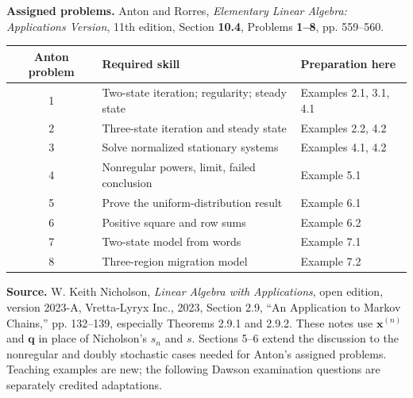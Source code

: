 \documentclass{article}
\theoremstyle{plain}
\theoremstyle{definition}
\theoremstyle{remark}
\renewcommand{\vec}[1]{\mathbf{#1}}
\newcommand{\work}{\par\vfill}
\begin{document}
\medskip\textbf{Assigned problems.} Anton and Rorres, \emph{Elementary Linear Algebra: Applications Version}, 11th edition, Section \textbf{10.4}, Problems \textbf{1--8}, pp. 559--560.
\begin{center}
\renewcommand{\arraystretch}{1.4}
\begin{tabular}{c|l|l}
Anton problem & Required skill & Preparation here\\\hline
1 & Two-state iteration; regularity; steady state & Examples 2.1, 3.1, 4.1\\
2 & Three-state iteration and steady state & Examples 2.2, 4.2\\
3 & Solve normalized stationary systems & Examples 4.1, 4.2\\
4 & Nonregular powers, limit, failed conclusion & Example 5.1\\
5 & Prove the uniform-distribution result & Example 6.1\\
6 & Positive square and row sums & Example 6.2\\
7 & Two-state model from words & Example 7.1\\
8 & Three-region migration model & Example 7.2
\end{tabular}
\end{center}
\vfill
{\small\textbf{Source.} W. Keith Nicholson, \emph{Linear Algebra with Applications}, open edition, version 2023-A, Vretta-Lyryx Inc., 2023, Section 2.9, ``An Application to Markov Chains,'' pp. 132--139, especially Theorems 2.9.1 and 2.9.2. These notes use $\vec{x}^{(n)}$ and $\vec{q}$ in place of Nicholson's $s_n$ and $s$. Sections 5--6 extend the discussion to the nonregular and doubly stochastic cases needed for Anton's assigned problems. Teaching examples are new; the following Dawson examination questions are separately credited adaptations.}

\work

\newpage
\end{document}
